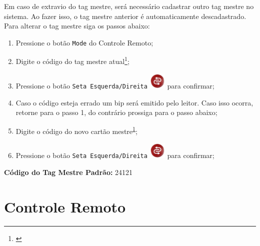 \documentclass[a4paper, 12pt]{article}
\begin{document}
Em caso de extravio do tag mestre, será necessário cadastrar outro tag mestre no sistema. Ao fazer isso, o tag mestre anterior é automaticamente descadastrado. Para alterar o tag mestre siga os passos abaixo:

\begin{enumerate}
\item Pressione o botão \texttt{Mode} do Controle Remoto;
\item Digite o código do tag mestre atual\footnote{\label{controle_remoto_alerta}\alertaControleRemoto};
\item Pressione o botão \texttt{Seta Esquerda/Direita} \includegraphics[height=8mm]{ok} para confirmar;
\item Caso o código esteja errado um bip será emitido pelo leitor. Caso isso ocorra, retorne para o passo 1, do contrário prossiga para o passo abaixo;
\item Digite o código do novo cartão mestre\textsuperscript{\ref{controle_remoto_alerta}};
\item Pressione o botão \texttt{Seta Esquerda/Direita} \includegraphics[height=8mm]{ok} para confirmar;
\end{enumerate}

\textbf{Código do Tag Mestre Padrão:} 24121\\\par

\section{Controle Remoto}
\end{document}

